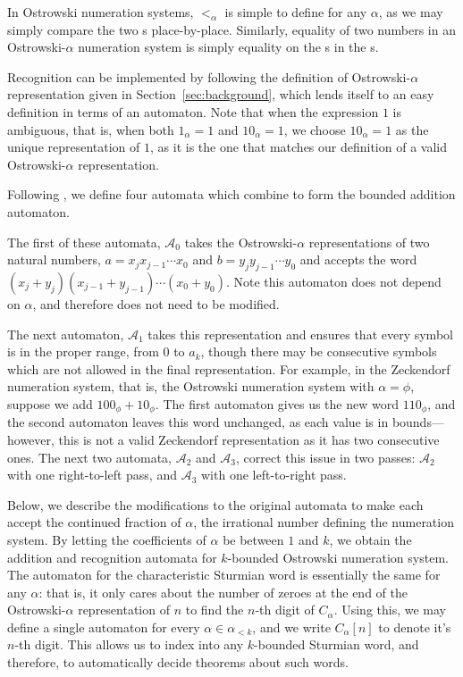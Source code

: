 In Ostrowski numeration systems, $<_{\alpha}$ is simple to define for any $\alpha$, as we may simply compare the two \word{}s place-by-place.
Similarly, equality of two numbers in an Ostrowski-$\alpha$ numeration system is simply equality on the s in the \word{}s.

Recognition can be implemented by following the definition of Ostrowski-$\alpha$ representation given in Section~\ref{sec:background}, which lends itself to an easy definition in terms of an automaton.
Note that when the expression $1$ is ambiguous, that is, when both $1_{\alpha} = 1$ and $10_{\alpha} = 1$, we choose $10_{\alpha} = 1$ as the unique representation of $1$, as it is the one that matches our definition of a valid Ostrowski-$\alpha$ representation.

Following \citeauthor{ht-ostrowski}, we define four automata which combine to form the bounded addition automaton.

The first of these automata, $\mathcal{A}_0$ takes the Ostrowski-$\alpha$ representations of two natural numbers, $a = x_j x_{j-1} \cdots x_0$ and $b = y_j y_{j-1} \cdots y_0$ and accepts the word $(x_j + y_j) (x_{j-1} + y_{j-1}) \cdots (x_0 + y_0)$.
Note this automaton does not depend on $\alpha$, and therefore does not need to be modified.

The next automaton, $\mathcal{A}_1$ takes this representation and ensures that every symbol is in the proper range, from $0$ to $a_k$, though there may be consecutive symbols which are not allowed in the final representation.
For example, in the Zeckendorf numeration system, that is, the Ostrowski numeration system with $\alpha = \phi$, suppose we add $100_{\phi} + 10_{\phi}$.
The first automaton gives us the new word $110_{\phi}$, and the second automaton leaves this word unchanged, as each value is in bounds---however, this is not a valid Zeckendorf representation as it has two consecutive ones.
The next two automata, $\mathcal{A}_2$ and $\mathcal{A}_3$, correct this issue in two passes: $\mathcal{A}_2$ with one right-to-left pass, and $\mathcal{A}_3$ with one left-to-right pass.

Below, we describe the modifications to the original automata to make each accept the continued fraction of $\alpha$, the irrational number defining the numeration system.
By letting the coefficients of $\alpha$ be between $1$ and $k$, we obtain the addition and recognition automata for $k$-bounded Ostrowski numeration system.
The automaton for the characteristic Sturmian word is essentially the same for any $\alpha$: that is, it only cares about the number of zeroes at the end of the Ostrowski-$\alpha$ representation of $n$ to find the $n$-th digit of $C_{\alpha}$.
Using this, we may define a single automaton for every $\alpha \in \alpha_{<k}$, and we write $C_{\alpha}[n]$ to denote it's $n$-th digit.
This allows us to index into any $k$-bounded Sturmian word, and therefore, to automatically decide theorems about such words.

